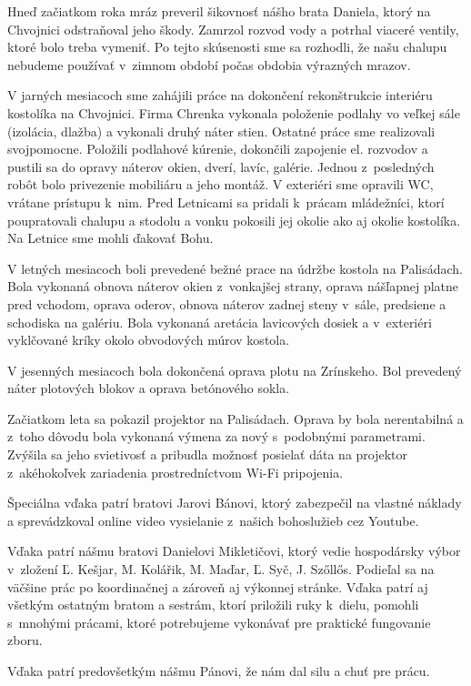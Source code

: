 Hneď začiatkom roka mráz preveril šikovnosť nášho brata Daniela, ktorý na Chvojnici odstraňoval jeho škody. Zamrzol rozvod vody a potrhal viaceré ventily, ktoré bolo treba vymeniť. Po tejto skúsenosti sme sa rozhodli, že našu chalupu nebudeme používať v~zimnom období počas obdobia výrazných mrazov.

V jarných mesiacoch sme zahájili práce na dokončení rekonštrukcie interiéru kostolíka na Chvojnici. Firma Chrenka vykonala položenie podlahy vo veľkej sále (izolácia, dlažba) a vykonali druhý náter stien. Ostatné práce sme realizovali svojpomocne. Položili podlahové kúrenie,  dokončili zapojenie el. rozvodov a  pustili sa do opravy náterov okien,  dverí, lavíc, galérie. Jednou z~posledných robôt bolo privezenie mobiliáru a jeho montáž. V exteriéri sme opravili WC, vrátane prístupu k~nim. Pred Letnicami sa pridali k~prácam mládežníci, ktorí poupratovali chalupu a stodolu a vonku pokosili jej okolie ako aj okolie kostolíka.
Na Letnice sme mohli ďakovať Bohu.

V letných mesiacoch boli prevedené bežné prace na údržbe kostola na Palisádach. Bola vykonaná obnova náterov okien z~vonkajšej strany, oprava nášľapnej platne pred vchodom, oprava oderov, obnova náterov zadnej steny v~sále, predsiene a schodiska na galériu. Bola vykonaná aretácia lavicových dosiek a v~exteriéri vyklčované kríky okolo obvodových múrov kostola.

V jesenných mesiacoch bola dokončená oprava plotu na Zrínskeho. Bol prevedený náter plotových blokov a oprava betónového sokla.

Začiatkom leta sa pokazil projektor na Palisádach. Oprava by bola nerentabilná a z~toho dôvodu bola vykonaná výmena za nový s~podobnými parametrami. Zvýšila sa jeho svietivosť a pribudla možnosť posielať dáta na projektor z~akéhokoľvek zariadenia prostredníctvom Wi-Fi pripojenia.

Špeciálna vďaka patrí bratovi Jarovi Bánovi, ktorý zabezpečil na vlastné náklady a sprevádzkoval online video vysielanie z~našich bohoslužieb cez Youtube.

Vďaka patrí nášmu bratovi Danielovi Mikletičovi, ktorý vedie hospodársky výbor v~zložení Ľ. Kešjar, M. Kolářik, M. Maďar,  Ľ. Syč, J. Szőllős. Podieľal sa na väčšine prác po koordinačnej a zároveň aj výkonnej stránke. Vďaka patrí aj všetkým ostatným bratom a sestrám, ktorí priložili ruky k~dielu, pomohli s~mnohými prácami, ktoré potrebujeme vykonávať pre praktické fungovanie zboru.

Vďaka patrí predovšetkým nášmu Pánovi, že nám dal silu a chuť pre prácu.

